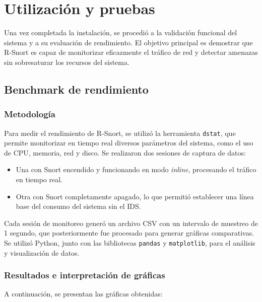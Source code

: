 \documentclass[11pt,a4paper,twoside]{report}
\begin{document}
\pagebreak



\section{Utilización y pruebas}

Una vez completada la instalación, se procedió a la validación funcional del sistema y a su evaluación de rendimiento. El objetivo principal es demostrar que R-Snort es capaz de monitorizar eficazmente el tráfico de red y detectar amenazas sin sobresaturar los recursos del sistema.

\subsection{Benchmark de rendimiento}

\subsubsection{Metodología}

Para medir el rendimiento de R-Snort, se utilizó la herramienta \texttt{dstat}, que permite monitorizar en tiempo real diversos parámetros del sistema, como el uso de CPU, memoria, red y disco. Se realizaron dos sesiones de captura de datos:

\begin{itemize}
	\item Una con Snort encendido y funcionando en modo \textit{inline}, procesando el tráfico en tiempo real.
	\item Otra con Snort completamente apagado, lo que permitió establecer una línea base del consumo del sistema sin el IDS.
\end{itemize}

Cada sesión de monitoreo generó un archivo CSV con un intervalo de muestreo de 1 segundo, que posteriormente fue procesado para generar gráficas comparativas. Se utilizó Python, junto con las bibliotecas \texttt{pandas} y \texttt{matplotlib}, para el análisis y visualización de datos.

\subsubsection{Resultados e interpretación de gráficas}

A continuación, se presentan las gráficas obtenidas:
\end{document}
